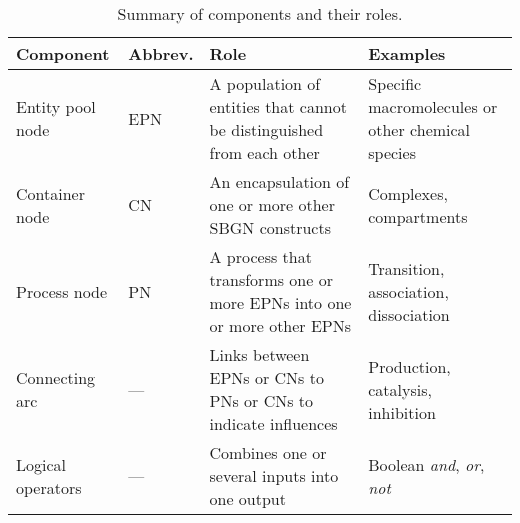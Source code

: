 \begin{table}[bh]
  \centering
  \small
  \begin{tabular}{@{}llP{2.4in}P{1.6in}@{}}
    \toprule
    \textbf{Component} & \textbf{Abbrev.} & \textbf{Role} & \textbf{Examples}\\
    \midrule
    Entity pool node
    & EPN
    & A population of entities that cannot be distinguished from each other
    & Specific macromolecules or other chemical species \\[0.5em]

    Container node	
    & CN
    & An encapsulation of one or more other SBGN constructs
    & Complexes, compartments \\[1.6em]

    Process node
    & PN
    & A process that transforms one or more EPNs into one or more other EPNs
    & Transition, association, dissociation \\[0.5em]

    Connecting arc
    & ---
    & Links between EPNs or CNs to PNs or CNs to indicate influences
    & Production, catalysis, inhibition \\[0.5em]

    Logical operators
    & ---
    & Combines one or several inputs into one output
    & Boolean \emph{and}, \emph{or}, \emph{not} \\
    \bottomrule
  \end{tabular}
  \caption{Summary of \PD components and their roles.}
  \label{tab:component-summary}
\end{table}






